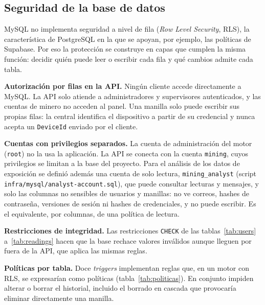 \documentclass[10pt,a4paper]{article}
\newcommand{\code}[1]{{\small\urlstyle{tt}\nolinkurl{#1}}}
\begin{document}
\subsection{Seguridad de la base de datos}
\label{sec:seguridad-bd}
MySQL no implementa seguridad a nivel de fila (\emph{Row Level Security}, RLS), la característica de PostgreSQL en la que se apoyan, por ejemplo, las políticas de Supabase. Por eso la protección se construye en capas que cumplen la misma función: decidir quién puede leer o escribir cada fila y qué cambios admite cada tabla.

\textbf{Autorización por filas en la API.} Ningún cliente accede directamente a MySQL. La API solo atiende a administradores y supervisores autenticados, y las cuentas de minero no acceden al panel. Una manilla solo puede escribir sus propias filas: la central identifica el dispositivo a partir de su credencial y nunca acepta un \code{DeviceId} enviado por el cliente.

\textbf{Cuentas con privilegios separados.} La cuenta de administración del motor (\code{root}) no la usa la aplicación. La API se conecta con la cuenta \code{mining}, cuyos privilegios se limitan a la base del proyecto. Para el análisis de los datos de exposición se definió además una cuenta de solo lectura, \code{mining_analyst} (script \code{infra/mysql/analyst-account.sql}), que puede consultar lecturas y mensajes, y solo las columnas no sensibles de usuarios y manillas: no ve correos, hashes de contraseña, versiones de sesión ni hashes de credenciales, y no puede escribir. Es el equivalente, por columnas, de una política de lectura.

\textbf{Restricciones de integridad.} Las restricciones \code{CHECK} de las tablas~\ref{tab:users} a~\ref{tab:readings} hacen que la base rechace valores inválidos aunque lleguen por fuera de la API, que aplica las mismas reglas.

\textbf{Políticas por tabla.} Doce \emph{triggers} implementan reglas que, en un motor con RLS, se expresarían como políticas (tabla~\ref{tab:politicas}). En conjunto impiden alterar o borrar el historial, incluido el borrado en cascada que provocaría eliminar directamente una manilla.
\end{document}
